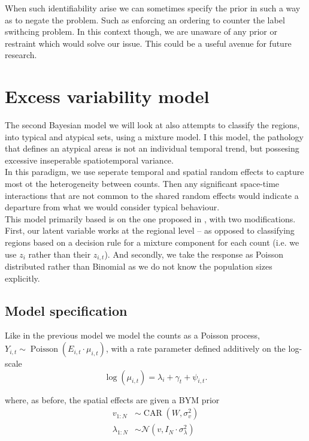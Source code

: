 \documentclass[11pt]{report}
\begin{document}
When such identifiability arise we can sometimes specify the prior in such a way as to negate the problem. Such as enforcing an ordering to counter the label swithcing problem. In this context though, we are unaware of any prior or restraint which would solve our issue. This could be a useful avenue for future research.

\chapter{Excess variability model}

The second Bayesian model we will look at also attempts to classify the regions, into typical and atypical sets, using a mixture model. I this model, the pathology that defines an atypical areas is not an individual temporal trend, but possesing excessive inseperable spatiotemporal variance. \\

In this paradigm, we use seperate temporal and spatial random effects to capture most ot the heterogeneity between counts. Then any significant space-time interactions that are not common to the shared random effects would indicate a departure from what we would consider typical behaviour. \\

This model primarily based is on the one proposed in \citet{stability}, with two modifications. First, our latent variable works at the regional level -- as opposed to classifying regions based on a decision rule for a mixture component for each count (i.e. we use $z_{i}$ rather than their $z_{i,t}$). And secondly, we take the response as Poisson distributed rather than Binomial as we do not know the population sizes explicitly.

\section{Model specification}

Like in the previous model we model the counts as a Poisson process, $Y_{i,t} \sim \operatorname{Poisson}(E_{i,t} \cdot \mu_{i,t})$, with a rate parameter defined additively on the log-scale
\begin{equation}
\log(\mu_{i,t}) = \lambda_i + \gamma_t + \psi_{i,t}.
\end{equation}

where, as before, the spatial effects are given a BYM prior
\begin{align*}
v_{1:N} &\sim \operatorname{CAR}(W, \sigma_v^2) \\
\lambda_{1:N} &\sim \mathcal{N}(v, I_N \cdot \sigma_\lambda^2) \\
\end{align*}
\end{document}
